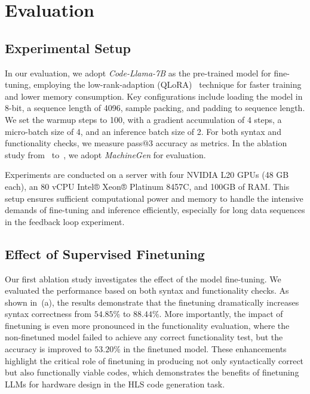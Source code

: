 \section{Evaluation}

\subsection{Experimental Setup}\label{subsec:exp_setup}

In our evaluation, we adopt \textit{Code-Llama-7B} as the pre-trained model for fine-tuning, employing the low-rank-adaption (QLoRA)~\cite{hu2021lora, dettmers2024qlora} technique for faster training and lower memory consumption. 
Key configurations include loading the model in 8-bit, a sequence length of 4096, sample packing, and padding to sequence length. We set the warmup steps to 100, with a gradient accumulation of 4 steps, a micro-batch size of 4, and an inference batch size of 2.
For both syntax and functionality checks, we measure pass@3 accuracy as metrics. In the ablation study from~ to~, we adopt \textit{MachineGen} for evaluation.

Experiments are conducted on a server with four NVIDIA L20 GPUs (48 GB each), an 80 vCPU Intel® Xeon® Platinum 8457C, and 100GB of RAM. This setup ensures sufficient computational power and memory to handle the intensive demands of fine-tuning and inference efficiently, especially for long data sequences in the feedback loop experiment. 

\subsection{Effect of Supervised Finetuning}\label{subsec:exp_finetune}
Our first ablation study investigates the effect of the model fine-tuning.
We evaluated the performance based on both syntax and functionality checks. 
As shown in~(a), the results demonstrate that the finetuning dramatically increases syntax correctness from $54.85$\% to $88.44$\%. 
More importantly, the impact of finetuning is even more pronounced in the functionality evaluation, where the non-finetuned model failed to achieve any correct functionality test, but the accuracy is improved to $53.20$\% in the finetuned model. These enhancements highlight the critical role of finetuning in producing not only syntactically correct but also functionally viable codes, which demonstrates the benefits of finetuning LLMs for hardware design in the HLS code generation task.





